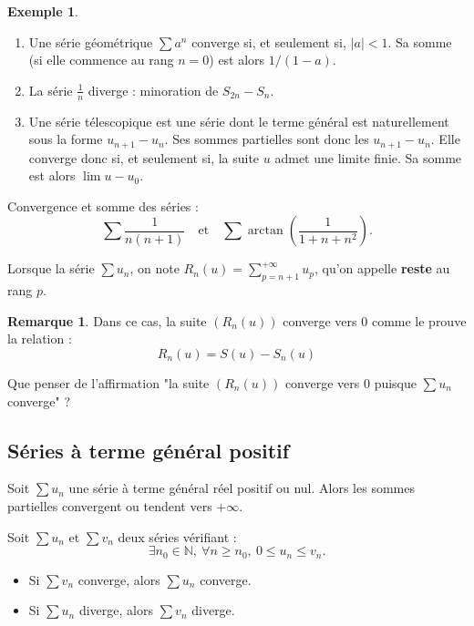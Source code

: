 \documentclass[french]{article}
\newcommand{\N}{\mathbb{N}}
\theoremstyle{plain}
\theoremstyle{definition}
\newtheorem*{ex}{Exemple}
\newtheorem*{rmq}{Remarque}
\theoremstyle{remark}
\begin{document}
\begin{ex}%
	\begin{enumerate}
		\item Une série géométrique $\displaystyle\sum a^n$ converge si, et seulement si, $\lvert a\rvert<1$. Sa somme (si elle commence au rang $n=0$) est alors $1/(1-a)$.
		\item La série $\displaystyle\frac{1}{n}$ diverge : minoration de $S_{2n}-S_n$.
		\item Une série télescopique est une série dont le terme général est naturellement sous la forme $u_{n+1}-u_n$. Ses sommes partielles sont donc les $u_{n+1}-u_n$. Elle converge donc si, et seulement si, la suite $u$ admet une limite finie. Sa somme est alors $\lim u-u_0$.
	\end{enumerate}
\end{ex}

\begin{exo}
	Convergence et somme des séries :
	$$\sum\frac{1}{n(n+1)}\quad \text{et}\quad \sum\arctan\left(\frac{1}{1+n+n^2}\right).$$
\end{exo}

\begin{dfn}
	Lorsque la série $\displaystyle\sum u_n$, on note $\displaystyle R_n(u)=\sum_{p=n+1}^{+\infty}u_p$, qu'on appelle \textbf{reste} au rang $p$.
\end{dfn}

\begin{rmq}
	Dans ce cas, la suite $(R_n(u))$ converge vers $0$ comme le prouve la relation : $$R_n(u)=S(u)-S_n(u)$$
\end{rmq}

\begin{exo}
	Que penser de l'affirmation "la suite $(R_n(u))$ converge vers $0$ puisque $\displaystyle\sum u_n$ converge" ?
\end{exo}

\subsection{Séries à terme général positif}

\begin{prop}%
	Soit $\displaystyle\sum u_n$ une série à terme général réel positif ou nul. Alors les sommes partielles convergent ou tendent vers $+\infty$.
\end{prop}

\begin{prop}
	Soit $\displaystyle\sum u_n$ et $\displaystyle\sum v_n$ deux séries vérifiant : $$\exists n_0\in\N,\ \forall n\geqslant n_0,\ 0\leqslant u_n\leqslant v_n.$$
	\begin{itemize}
		\item Si $\displaystyle\sum v_n$ converge, alors $\displaystyle\sum u_n$ converge.
		\item Si $\displaystyle\sum u_n$ diverge, alors $\displaystyle\sum v_n$ diverge.
	\end{itemize}
\end{prop}
\end{document}
